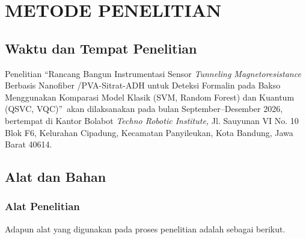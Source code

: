 \chapter{METODE PENELITIAN}

\section{Waktu dan Tempat Penelitian}
Penelitian \textquotedblleft Rancang Bangun Instrumentasi Sensor \textit{Tunneling Magnetoresistance} Berbasis Nanofiber /PVA-Sitrat-ADH untuk Deteksi Formalin pada Bakso Menggunakan Komparasi Model Klasik (SVM, Random Forest) dan Kuantum (QSVC, VQC)\textquotedblright\ akan dilaksanakan pada bulan September--Desember 2026, bertempat di Kantor Bolabot \textit{Techno Robotic Institute,} Jl. Sauyunan VI No. 10 Blok F6, Kelurahan Cipadung, Kecamatan Panyileukan, Kota Bandung, Jawa Barat 40614.

\section{Alat dan Bahan}
\subsection{Alat Penelitian}
Adapun alat yang digunakan pada proses penelitian adalah sebagai berikut.

